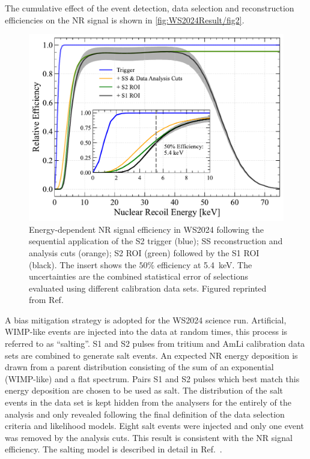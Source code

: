 The cumulative effect of the event detection, data selection and reconstruction efficiencies on the NR signal is shown in \autoref{fig:WS2024Result/fig2}.
\begin{figure}[t!]
    \centering
    \includegraphics[width=0.7\linewidth]{figures/WS2024Result/figure2.pdf}
    \caption{Energy-dependent NR signal efficiency in WS2024 following the sequential application of the S2 trigger (blue); SS reconstruction and analysis cuts (orange); S2 ROI (green) followed by the S1 ROI (black). The insert shows the $50\%$ efficiency at 5.4~keV. The uncertainties are the combined statistical error of selections evaluated using different calibration data sets. Figured reprinted from Ref.~\cite{LZCollaboration:2024lux}}
    \label{fig:WS2024Result/fig2}
\end{figure}
A bias mitigation strategy is adopted for the WS2024 science run. Artificial, WIMP-like events are injected into the data at random times, this process is referred to as ``salting''. S1 and S2 pulses from tritium and AmLi calibration data sets are combined to generate salt events. An expected NR energy deposition is drawn from a parent distribution consisting of the sum of an exponential (WIMP-like) and a flat spectrum. Pairs S1 and S2 pulses which best match this energy deposition are chosen to be used as salt. The distribution of the salt events in the data set is kept hidden from the analysers for the entirely of the analysis and only revealed following the final definition of the data selection criteria and likelihood models. Eight salt events were injected and only one event was removed by the analysis cuts. This result is consistent with the NR signal efficiency. The salting model is described in detail in Ref.~\cite{LZCollaboration:2024lux}.

